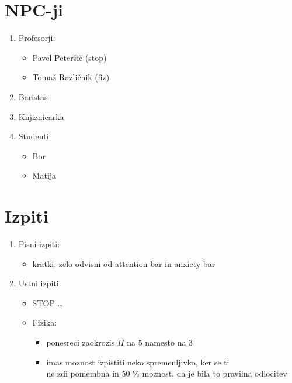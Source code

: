 \documentclass[a4paper]{article}
\begin{document}
\section{NPC-ji}
\begin{enumerate}
    \item Profesorji: \begin{itemize}
        \item Pavel Peteršič (stop)
        \item Tomaž Različnik (fiz)
    \end{itemize}
    \item Baristas
    \item Knjiznicarka
    \item Studenti: \begin{itemize}
        \item Bor
        \item Matija
    \end{itemize}
\end{enumerate}

\section{Izpiti}
\begin{enumerate}
    \item Pisni izpiti: \begin{itemize}
        \item kratki, zelo odvisni od attention bar in anxiety bar
    \end{itemize}

    \item Ustni izpiti: \begin{itemize}
        \item STOP\: \ldots
        \item Fizika: \begin{itemize}
            \item ponesreci zaokrozis $\Pi$ na 5 namesto na 3
            \item imas moznost izpistiti neko spremenljivko, ker se ti\\
            ne zdi pomembna in 50 \% moznost, da je bila to pravilna odlocitev
        \end{itemize}
    \end{itemize}
\end{enumerate}
\end{document}
